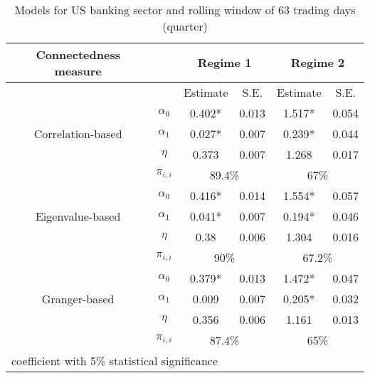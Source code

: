 \documentclass{article}
\begin{document}
\
\begin{table}[H]
  \begin{center}
  \caption{Models for US banking sector and rolling window of 63 trading days (quarter)}
  \label{table:us}
  \begin{tabular}{cccccc}
    \toprule
     Connectedness measure &  & \multicolumn{2}{c}{\bfseries Regime 1} & \multicolumn{2}{c}{\bfseries Regime 2}  \\
     \hline
     & & Estimate & S.E. & Estimate & S.E. \\
     \hline
     \multirow{3}{*}[\normalbaselineskip]{Correlation-based} & $\alpha_0$ & 0.402* & 0.013 & 1.517*  & 0.054 \\
      & $\alpha_1$ & 0.027* & 0.007 & 0.239* & 0.044 \\
      & $\eta$ & 0.373 & 0.007 & 1.268 & 0.017 \\
      & $\pi_{i,i}$ &  \multicolumn{2}{c}{89.4\%} & \multicolumn{2}{c}{67\%}\\
      \hline
      \multirow{3}{*}[\normalbaselineskip]{Eigenvalue-based} & $\alpha_0$ & 0.416* & 0.014 & 1.554*  & 0.057 \\
      & $\alpha_1$ & 0.041* & 0.007 & 0.194* & 0.046 \\
      & $\eta$ & 0.38 & 0.006 & 1.304 & 0.016 \\
      & $\pi_{i,i}$ &  \multicolumn{2}{c}{90\%} & \multicolumn{2}{c}{67.2\%}\\
      \hline
      \multirow{3}{*}[\normalbaselineskip]{Granger-based} & $\alpha_0$ & 0.379* & 0.013 & 1.472*  & 0.047 \\
      & $\alpha_1$ & 0.009 & 0.007 & 0.205* & 0.032 \\
      & $\eta$ & 0.356 & 0.006 & 1.161 & 0.013 \\
      & $\pi_{i,i}$ &  \multicolumn{2}{c}{87.4\%} & \multicolumn{2}{c}{65\%}\\
      \hline
    \multicolumn{6}{l}{\footnotesize * coefficient with 5\% statistical significance} \\
    \hline
  \end{tabular}
\end{center}
\end{table}
\end{document}
